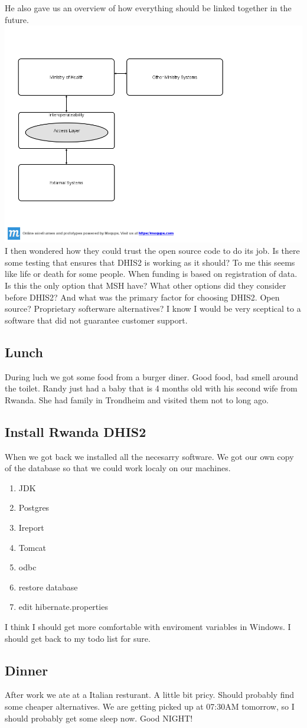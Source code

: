 He also gave us an overview of how everything should be linked together in the future.\\
\includegraphics[width=15cm]{appendix/images/future_design_rwanda}\\
I then wondered how they could trust the open source code to do its job. Is there some testing that ensures that DHIS2 is working as it should? To me this seems like life or death for some people. When funding is based on registration of data. Is this the only option that MSH have? What other options did they consider before DHIS2? And what was the primary factor for choosing DHIS2. Open source? Proprietary softerware alternatives? I know I would be very sceptical to a software that did not guarantee customer support. 
\subsection{Lunch}
During luch we got some food from a burger diner. Good food, bad smell around the toilet. Randy just had a baby that is 4 months old with his second wife from Rwanda. She had family in Trondheim and visited them not to long ago. 
\subsection{Install Rwanda DHIS2}
When we got back we installed all the necesarry software. We got our own copy of the database so that we could work localy on our machines.
\begin{enumerate}
\item JDK
\item Postgres
\item Ireport
\item Tomcat
\item odbc
\item restore database
\item edit hibernate.properties
\end{enumerate}
I think I should get more comfortable with enviroment variables in Windows. 
I should get back to my todo list for sure.
\subsection{Dinner}
After work we ate at a Italian resturant. A little bit pricy. Should probably find some cheaper alternatives.
We are getting picked up at 07:30AM tomorrow, so I should probably get some sleep now. Good NIGHT!

